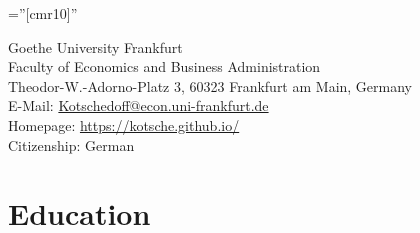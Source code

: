 \documentclass[a4paper,10pt]{article} %
\begin{document}
\pagestyle{empty} %

\font\fb=''[cmr10]'' %


\par{\bigskip\par} %


\begin{center}
Goethe University Frankfurt \\
Faculty of Economics and Business Administration \\
Theodor-W.-Adorno-Platz 3, 60323 Frankfurt am Main, Germany  \\
E-Mail: \href{mailto:Kotschedoff@econ.uni-frankfurt.de}{Kotschedoff@econ.uni-frankfurt.de} \\
Homepage: \url{https://kotsche.github.io/} \\
Citizenship: German \\
\end{center}
 
  



\section{Education}
\end{document}
